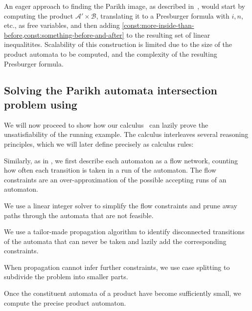 
An eager approach to finding the Parikh
image, as described in~\cite{generate-parikh-image}, would start by
computing the product $\mathcal{A}' \times \mathcal{B}$, translating it to a Presburger formula with
$i, n$, etc., as free variables, and then adding
\cref{const:more-inside-than-before,const:something-before-and-after} to the
resulting set of linear inequalitites. Scalability of this
construction is limited due to the size of the product automata to be computed,
and the complexity of the resulting Presburger formula.

\subsection{Solving the Parikh automata intersection problem using \Calculus{}}

We will now proceed to show how our calculus~\Calculus{} can lazily
prove the unsatisfiability of the running example. The calculus
interleaves several reasoning principles, which we will later
define precisely as calculus rules:
\begin{inparaenum}[(i)]
\item Similarly, as in \cite{generate-parikh-image}, we first describe
  each automaton as a flow network, counting how often each transition
  is taken in a run of the automaton. The flow constraints are an
  over-approximation of the possible accepting runs of an automaton.
\item We use a linear integer solver to simplify the flow constraints
  and prune away paths through the automata that are not feasible.
\item We use a tailor-made propagation algorithm to identify disconnected
  transitions of the automata that can never be taken and lazily add
  the corresponding constraints.
\item When propagation cannot infer further constraints, we use case
  splitting to subdivide the problem into smaller parts.
\item Once the constituent automata of a product have become
  sufficiently small, we compute the precise product automaton.
\end{inparaenum}

